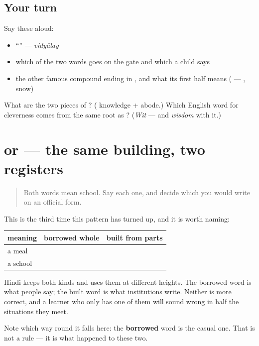 \subsection*{Your turn}
Say these aloud:

\begin{itemize}
\raggedright
  \item \textquotedblleft{}\textquotedblright{} — \emph{vidyālay}
  \item which of the two words goes on the gate and which a child says
  \item the other famous compound ending in , and what its first half means ( — , snow)
\end{itemize}

\begin{tcolorbox}[breakable,colback=teal!4,colframe=teal!35!black,title={Before you move on}]
What are the two pieces of \textbf{}? ( knowledge +  abode.) Which English word for cleverness comes from the same root as ? (\emph{Wit} — and \emph{wisdom} with it.)
\end{tcolorbox}
\section[\texorpdfstring{\hi{स्कूल} / \hi{विद्यालय} (skūl / vidyālay)}{स्कूल / विद्यालय (skūl / vidyālay)}]{ or  — the same building, two registers}

\label{lesson:HI-C81-repaso-skool}



\begin{quote}
Both words mean school. Say each one, and decide which you would write on an official form.
\end{quote}

\begin{grammarlens}[title={Grammar Lens: borrowed whole, or built from parts}]
This is the third time this pattern has turned up, and it is worth naming:

\noindent
\begin{tabularx}{\linewidth}{@{}>{\raggedright\arraybackslash}X>{\raggedright\arraybackslash}X>{\raggedright\arraybackslash}X@{}}
\toprule
\textbf{meaning} & \textbf{borrowed whole} & \textbf{built from parts} \\
\midrule
a meal & \hi{नाश्ता} & \hi{दोपहर} \hi{का} \hi{खाना} \\
a school & \hi{स्कूल} & \hi{विद्यालय} \\
\bottomrule
\end{tabularx}

Hindi keeps both kinds and uses them at different heights. The borrowed word is what people say; the built word is what institutions write. Neither is more correct, and a learner who only has one of them will sound wrong in half the situations they meet.

Note which way round it falls here: the \textbf{borrowed} word is the casual one. That is not a rule — it is what happened to these two.
\end{grammarlens}

